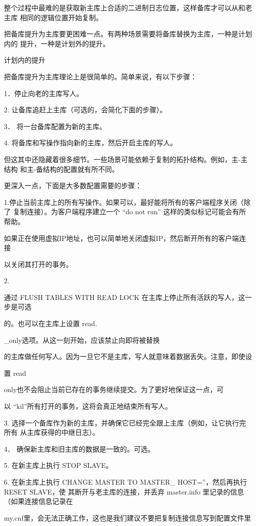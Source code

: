 整个过程中最难的是获取新主库上合适的二进制日志位置，这样备库才可以从和老主库
相同的逻辑位置开始复制。

把备库提升为主库要更困难一点。有两种场景需要将备库替换为主库，一种是计划内的
提升，一种是计划外的提升。

计划内的提升

把备库提升为主库理论上是很简单的。简单来说，有以下步骤：

1．停止向老的主库写人。

2. 让备库追赶上主库（可选的，会简化下面的步骤）。

3． 将一台备库配置为新的主库。

4. 将备库和写操作指向新的主库，然后开启主库的写人。

但这其中还隐藏着很多细节。一些场景可能依赖于复制的拓扑结构。例如，主-主结构
和主-备结构的配置就有所不同。

更深入一点，下面是大多数配置需要的步骤：

1.停止当前主库上的所有写操作。如果可以，最好能将所有的客户端程序关闭（除了
复制连接）。为客户端程序建立一个 “do not run” 这样的类似标记可能会有所帮助。

如果正在使用虚拟IP地址，也可以简单地关闭虚拟IP，然后断开所有的客户端连接

以关闭其打开的事务。

2.

通过 FLUSH TABLES WITH READ LOCK 在主库上停止所有活跃的写人，这一步是可选

的。也可以在主库上设置 read.

\_only选项。从这一刻开始，应该禁止向即将被替换

的主库做任何写人。因为一旦它不是主库，写人就意味着数据丢失。注意，即使设

置 read

only也不会阻止当前已存在的事务继续提交。为了更好地保证这一点，可

以 “kil”所有打开的事务，这将会真正地结束所有写人。

3. 选择一个备库作为新的主库，并确保它已经完全跟上主库（例如，让它执行完所有
从主库获得的中继日志）。

4． 确保新主库和旧主库的数据是一致的。可选。

5. 在新主库上执行 STOP SLAVE。

6. 在新主库上执行 CHANGE MASTER TO MASTER\_ HOST=''，然后再执行 RESET SLAVE，使
其断开与老主库的连接，并丢弃 master.info 里记录的信息（如果连接信息记录在

my.cnf里，会无法正确工作，这也是我们建议不要把复制连接信息写到配置文件里

